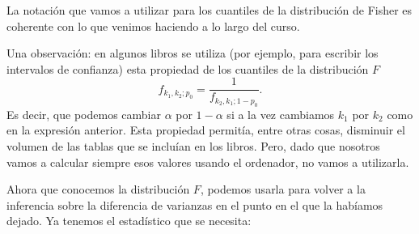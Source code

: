 La notación que vamos a utilizar para los cuantiles de la distribución de Fisher es coherente con lo que venimos haciendo a lo largo del curso.
    \begin{center}
    \end{center}
Una observación: en algunos libros se utiliza (por ejemplo, para escribir los intervalos de confianza) esta propiedad de los cuantiles de la distribución $F$
    \[f_{k_1,k_2;p_0}=\dfrac{1}{f_{k_2,k_1;1-p_0}}.\]
Es decir, que podemos cambiar $\alpha$ por $1-\alpha$ si a la vez cambiamos $k_1$ por $k_2$ como en
la expresión anterior.
Esta propiedad permitía, entre otras cosas, disminuir el volumen de las tablas que se incluían en los libros. Pero, dado que nosotros vamos a calcular siempre esos valores usando el ordenador, no vamos a utilizarla.

Ahora que conocemos la distribución $F$, podemos usarla para volver a la inferencia sobre la diferencia de varianzas en el punto en el que la habíamos dejado. Ya tenemos el estadístico que se necesita:
\begin{center}
\end{center}

